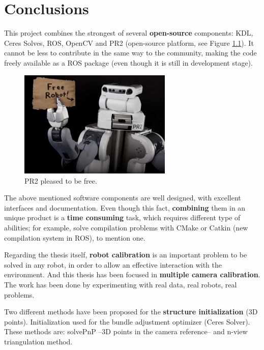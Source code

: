 \chapter{Conclusions}
\label{cha:conclusions}

This project combines the strongest of several \textbf{open-source} components: KDL, Ceres Solves, ROS, OpenCV and PR2 (open-source platform, see Figure \ref{fig:PR2_free_robot}). It cannot be less to contribute in the same way to the community, making the code freely available as a ROS package (even though it is still in development stage).

\begin{figure}[!htbp]
 \centering
 \includegraphics[width=0.65\textwidth]{images/PR2_free_robot.jpg}
 \caption{PR2 pleased to be free.}
 \label{fig:PR2_free_robot}
\end{figure}

The above mentioned software components are well designed, with excellent interfaces and documentation. Even though this fact, \textbf{combining} them in an unique product is a \textbf{time consuming} task, which requires different type of abilities; for example, solve compilation problems with CMake or Catkin (new compilation system in ROS), to mention one.

Regarding the thesis itself, \textbf{robot calibration} is an important problem to be solved in any robot, in order to allow an effective interaction with the environment. And this thesis has been focused in \textbf{multiple camera calibration}. The work has been done by experimenting with real data, real robots, real problems.

Two different methods have been proposed for the \textbf{structure initialization} (3D points). Initialization used for the bundle adjustment optimizer (Ceres Solver). These methods are: solvePnP --3D points in the camera reference-- and n-view triangulation method.

